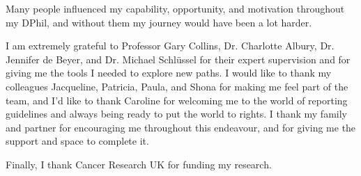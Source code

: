Many people influenced my capability, opportunity, and motivation throughout my DPhil, and without them my journey would have been a lot harder.

I am extremely grateful to Professor Gary Collins, Dr. Charlotte Albury, Dr. Jennifer de Beyer, and Dr. Michael Schlüssel for their expert supervision and for giving me the tools I needed to explore new paths. I would like to thank my colleagues Jacqueline, Patricia, Paula, and Shona for making me feel part of the team, and I'd like to thank Caroline for welcoming me to the world of reporting guidelines and always being ready to put the world to rights. I thank my family and partner for encouraging me throughout this endeavour, and for giving me the support and space to complete it.

Finally, I thank Cancer Research UK for funding my research. 
